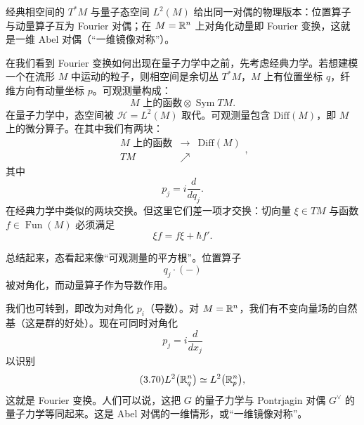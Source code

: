 \begin{sectionkey}
经典相空间的 $T^{*}M$ 与量子态空间 $L^2(M)$ 给出同一对偶的物理版本：位置算子与动量算子互为 Fourier 对偶；在 $M=\mathbb{R}^n$ 上对角化动量即 Fourier 变换，这就是一维 Abel 对偶（“一维镜像对称”）。
\end{sectionkey}

在我们看到 Fourier 变换如何出现在量子力学中之前，先考虑经典力学。若想建模一个在流形 $M$ 中运动的粒子，则相空间是余切丛 $T^{*}M$，$M$ 上有位置坐标 $q$，纤维方向有动量坐标 $p$。可观测量构成：
\begin{equation}\tag{3.64}
\text{$M$ 上的函数}\otimes\operatorname{Sym}TM.
\end{equation}
在量子力学中，态空间被 $\mathcal{H}=L^2(M)$ 取代。可观测量包含 $\mathrm{Diff}(M)$，即 $M$ 上的微分算子。在其中我们有两块：
\begin{equation}\tag{3.65}
\begin{array}{ccc}
\text{$M$ 上的函数} & \longrightarrow & \mathrm{Diff}(M)\\
TM & \nearrow &
\end{array},
\end{equation}
其中
\begin{equation}\tag{3.66}
p_j=i\frac{d}{dq_j}.
\end{equation}
在经典力学中类似的两块交换。但这里它们差一项才交换：切向量 $\xi\in TM$ 与函数 $f\in\operatorname{Fun}(M)$ 必须满足
\begin{equation}\tag{3.67}
\xi f=f\xi+\hbar f'.
\end{equation}

总结起来，态看起来像“可观测量的平方根”。位置算子
\begin{equation}\tag{3.68}
q_j\cdot(-)
\end{equation}
被对角化，而动量算子作为导数作用。

我们也可转到，即改为对角化 $p_i$（导数）。对 $M=\mathbb{R}^{n}$，我们有不变向量场的自然基（这是群的好处）。现在可同时对角化
\begin{equation}\tag{3.69}
p_j=i\frac{d}{dx_j}
\end{equation}
以识别
\begin{equation}\tag{3.70}
L^2\bigl(\mathbb{R}^{n}_{q}\bigr)\simeq L^2\bigl(\mathbb{R}^{n}_{p}\bigr),
\end{equation}
这就是 Fourier 变换。人们可以说，这把 $G$ 的量子力学与 Pontrjagin 对偶 $G^{\vee}$ 的量子力学等同起来。这是 Abel 对偶的一维情形，或“一维镜像对称”。


